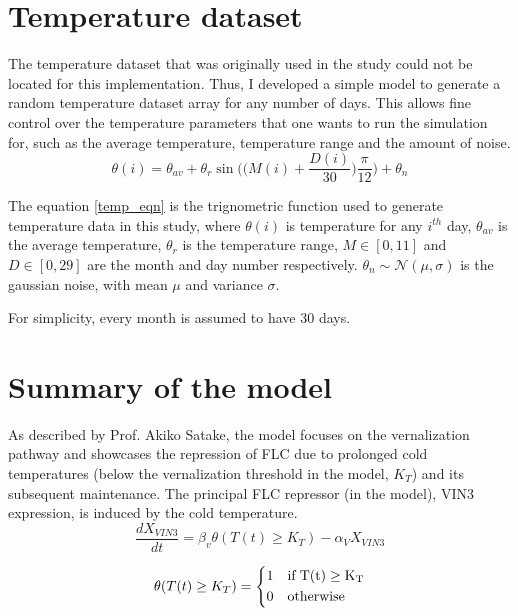 \documentclass[10 pt]{article}
\begin{document}
\section{Temperature dataset}

The temperature dataset that was originally used in the study could not be located for this implementation. Thus, I developed a simple model to generate a random temperature dataset array for any number of days. This allows fine control over the temperature parameters that one wants to run the simulation for, such as the average temperature, temperature range and the amount of noise.  
\begin{equation}\label{temp_eqn}
\theta(i) = \theta_{av} + \theta_{r} \sin\bigg(\Big(M(i) + \frac{D(i)}{30} \Big)\frac{\pi}{12}\bigg) + \theta_{n}
\end{equation}

The equation \ref{temp_eqn} is the trignometric function used to generate temperature data in this study, where $\theta(i)$ is temperature for any $i^{th}$ day, $\theta_{av}$ is the average temperature, $\theta_{r}$ is the temperature range, $M \in [0,11]$ and $D \in [0,29]$ are the month and day number respectively. $\theta_{n} \sim \mathcal{N}(\mu, \sigma)$ is the gaussian noise, with mean $\mu$ and variance $\sigma$. 

For simplicity, every month is assumed to have 30 days.
\pagebreak

\section{Summary of the model}

As described by Prof. Akiko Satake, the model focuses on the vernalization pathway and showcases the repression of FLC due to prolonged cold temperatures (below the vernalization threshold in the model, $K_{T}$) and its subsequent maintenance. The principal FLC repressor (in the model), VIN3 expression, is induced by the cold temperature. 
\begin{equation} 
\label{eqn1a}
\frac{dX_{VIN3}}{dt} = \beta_{v}\theta(T(t) \ge K_{T}) - \alpha_{V} X_{VIN3}
\end{equation}

\begin{equation} 
\label{eqn1b}
	\theta(T(t) \ge K_{T}) = \begin{dcases}
								 1 & \rm{if} \: T(t) \ge K_{T}\\
								 0 & \rm{otherwise}		
								\end{dcases} 
\end{equation}
\end{document}
